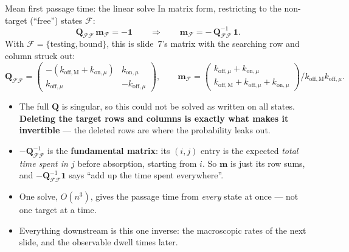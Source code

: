 \documentclass[10pt,aspectratio=169]{beamer}
\newcommand{\Q}{\bm{Q}}
\begin{document}
\begin{frame}{Mean first passage time: the linear solve}
  In matrix form, restricting to the non-target (``free'') states
  $\mathcal{F}$:
  \[
    \Q_{\mathcal{F}\mathcal{F}}\,\bm{m}_{\mathcal{F}} = -\bm{1}
    \qquad\Longrightarrow\qquad
    \bm{m}_{\mathcal{F}} = -\,\Q_{\mathcal{F}\mathcal{F}}^{-1}\,\bm{1} .
  \]
  With $\mathcal{F}=\{\text{testing},\text{bound}\}$, this is slide~7's
  matrix with the searching row and column struck out:
  \vspace{-0.9em}
  \[
    \Q_{\mathcal{F}\mathcal{F}} = \left(\begin{smallmatrix}
      -(k_{\mathrm{off,M}}+k_{\mathrm{on},\mu}) & k_{\mathrm{on},\mu}\\
      k_{\mathrm{off},\mu} & -k_{\mathrm{off},\mu}
    \end{smallmatrix}\right),
    \qquad
    \bm{m}_{\mathcal{F}} = \left(\begin{smallmatrix}
      k_{\mathrm{off},\mu}+k_{\mathrm{on},\mu}\\
      k_{\mathrm{off,M}}+k_{\mathrm{off},\mu}+k_{\mathrm{on},\mu}
    \end{smallmatrix}\right)
    \big/ k_{\mathrm{off,M}}k_{\mathrm{off},\mu} .
  \]
  \vspace{-0.9em}
  \begin{itemize}
    \item The full $\Q$ is singular, so this could not be solved as
      written on all states. \textbf{Deleting the target rows and columns
      is exactly what makes it invertible} --- the deleted rows are where
      the probability leaks out.
    \item $-\Q_{\mathcal{F}\mathcal{F}}^{-1}$ is the \textbf{fundamental
      matrix}: its $(i,j)$ entry is the expected \emph{total time spent in
      $j$} before absorption, starting from $i$. So $\bm{m}$ is just its
      row sums, and $-\Q_{\mathcal{F}\mathcal{F}}^{-1}\bm{1}$ says
      ``add up the time spent everywhere''.
    \item One solve, $O(n^3)$, gives the passage time from \emph{every}
      state at once --- not one target at a time.
    \item Everything downstream is this one inverse: the macroscopic rates
      of the next slide, and the observable dwell times later.
  \end{itemize}
\end{frame}
\end{document}
